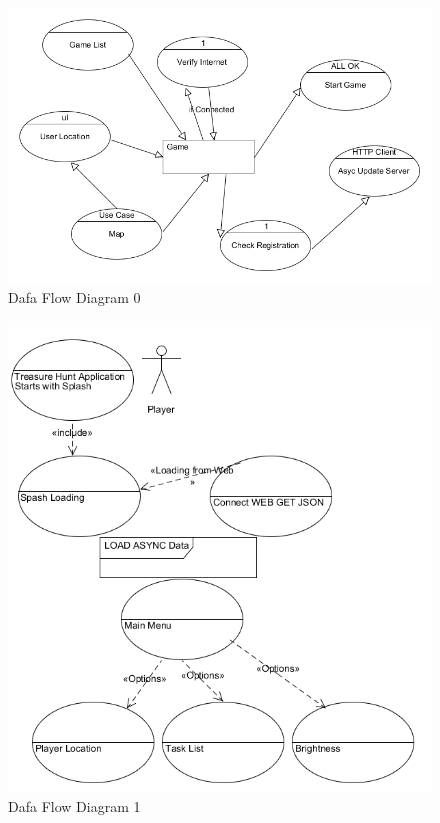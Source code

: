 \documentclass[12pt]{report}
\begin{document}
\begin{figure}[ht!]
\left
\includegraphics[width=150mm]{images/dfd0}
\caption{Dafa Flow Diagram 0}
\label{overflow}
\end{figure}
\newpage

\begin{figure}[ht!]
\left
\includegraphics[width=150mm]{dfd0}
\caption{Dafa Flow Diagram 1}
\label{overflow}
\end{figure}
\newpage
\end{document}
